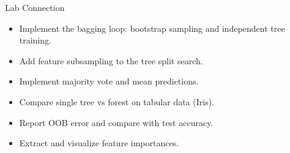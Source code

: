 \begin{frame}{Lab Connection}
\begin{itemize}
  \item Implement the bagging loop: bootstrap sampling and independent tree training.
  \pause
  \item Add feature subsampling to the tree split search.
  \pause
  \item Implement majority vote and mean predictions.
  \pause
  \item Compare single tree vs forest on tabular data (Iris).
  \pause
  \item Report OOB error and compare with test accuracy.
  \pause
  \item Extract and visualize feature importances.
\end{itemize}
\end{frame}
